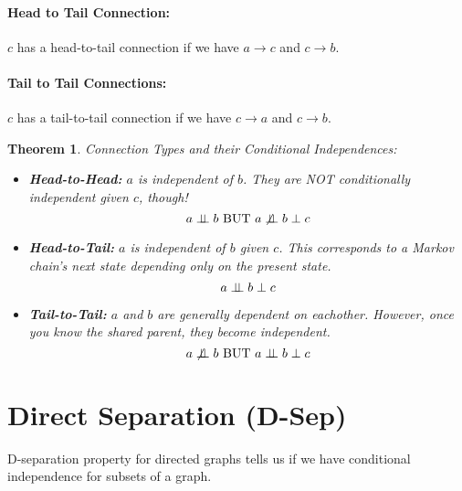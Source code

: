 \documentclass[a4paper,12pt]{report}
\newtheorem{theorem}{Theorem}
\begin{document}
\paragraph{Head to Tail Connection: } $c$ has a head-to-tail connection if we have $a\to c$ and $c\to b$. 

\paragraph{Tail to Tail Connections: } $c$ has a tail-to-tail connection if we have $c\to a$ and $c \to b$.


\begin{theorem}{Connection Types and their Conditional Independences: }
\begin{itemize}
\item \textbf{Head-to-Head:} $a$ is independent of $b$. They are NOT conditionally independent given $c$, though!
\begin{equation}
a \perp\!\!\!\perp b \text{ BUT } a \not\perp\!\!\!\perp b \perp c
\end{equation}

\item \textbf{Head-to-Tail:} $a$ is independent of $b$ given $c$. This corresponds to a Markov chain's next state depending only on the present state. 
\begin{equation}
a \perp\!\!\!\perp b \perp c
\end{equation}

\item \textbf{Tail-to-Tail:} $a$ and $b$ are generally dependent on eachother. However, once you know the shared parent, they become \textit{independent}.
\begin{equation}
a \not \perp\!\!\!\perp b \text{ BUT } a \perp\!\!\!\perp b \perp c
\end{equation}
\end{itemize}
\end{theorem}



\section{Direct Separation (D-Sep)}

D-separation property for directed graphs tells us if we have conditional independence for subsets of a graph.
\end{document}
